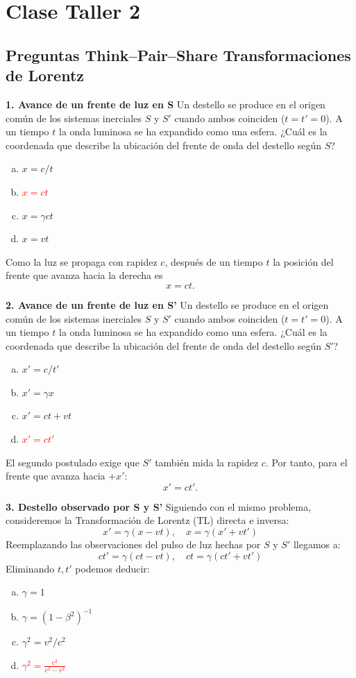 \chapter{Clase Taller 2}

\section{Preguntas Think--Pair--Share Transformaciones de Lorentz}

\textbf{1. Avance de un frente de luz en S}
Un destello se produce en el origen común de los sistemas inerciales $S$ y $S'$ cuando ambos coinciden ($t= t'= 0$). A un tiempo $t$ la onda luminosa se ha expandido como una esfera. ¿Cuál es la coordenada que describe la ubicación del frente de onda del destello según $S$?
\begin{enumerate}[a)]
    \item $x= c/t$
    \item \textcolor{red}{$x= ct$}
    \item $x= \gamma ct$
    \item $x= vt$
\end{enumerate}



Como la luz se propaga con rapidez $c$, después de un tiempo $t$ la posición del frente que avanza hacia la derecha es
\[
x=ct.
\]

\textbf{2. Avance de un frente de luz en S'}
Un destello se produce en el origen común de los sistemas inerciales $S$ y $S'$ cuando ambos coinciden ($t= t'= 0$). A un tiempo $t$ la onda luminosa se ha expandido como una esfera. ¿Cuál es la coordenada que describe la ubicación del frente de onda del destello según $S'$?
\begin{enumerate}[a)]
    \item $x'= c/t'$
    \item $x'= \gamma x$
    \item $x'= ct+ vt$
    \item \textcolor{red}{$x'= ct'$}
\end{enumerate}



El segundo postulado exige que $S'$ también mida la rapidez $c$. Por tanto, para el frente que avanza hacia $+x'$:
\[
x'=ct'.
\]

\textbf{3. Destello observado por S y S'}
Siguiendo con el mismo problema, consideremos la Transformación de Lorentz (TL) directa e inversa:
$$x'= \gamma(x - vt), \quad x= \gamma(x'+ vt')$$
Reemplazando las observaciones del pulso de luz hechas por $S$ y $S'$ llegamos a:
$$ct'= \gamma(ct - vt), \quad ct= \gamma(ct'+ vt')$$
Eliminando $t, t'$ podemos deducir:
\begin{enumerate}[a)]
    \item $\gamma= 1$
    \item $\gamma=(1 - \beta^2)^{-1}$
    \item $\gamma^2= v^2/c^2$
    \item \textcolor{red}{$\gamma^2= \frac{c^2}{c^2-v^2}$}
\end{enumerate}

